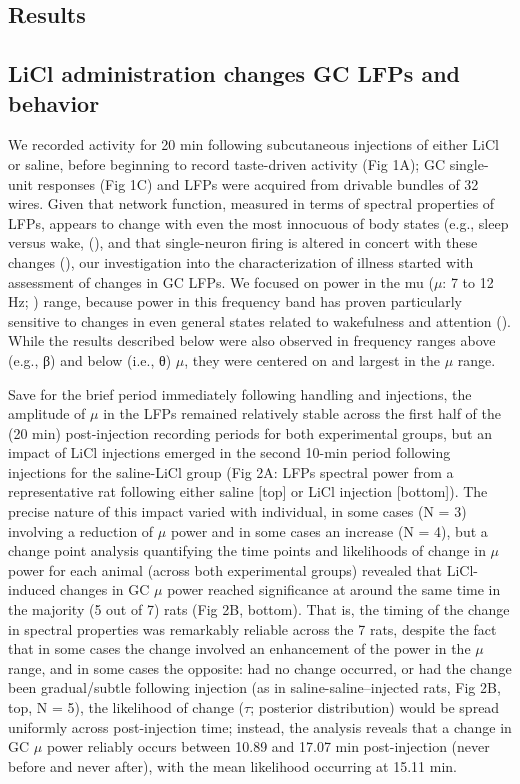\begin{refsection}
{\section{Results}
\subsection{LiCl administration changes GC LFPs and behavior}
We recorded activity for 20 min following subcutaneous injections of either LiCl or saline, before beginning to record taste-driven activity (Fig 1A); GC single-unit responses (Fig 1C) and LFPs were acquired from drivable bundles of 32 wires. Given that network function, measured in terms of spectral properties of LFPs, appears to change with even the most innocuous of body states (e.g., sleep versus wake, (\cite{mukamel2014a,ab2015a}), and that single-neuron firing is altered in concert with these changes (\cite{manning2009a,fontanini2008a}), our investigation into the characterization of illness started with assessment of changes in GC LFPs. We focused on power in the mu (\(\mu\): 7 to 12 Hz; \cite{fontanini2005a}) range, because power in this frequency band has proven particularly sensitive to changes in even general states related to wakefulness and attention (\cite{ching2014a,fontanini2005a,fontanini2006a,tort2010a,vijayan2013a}). While the results described below were also observed in frequency ranges above (e.g., β) and below (i.e., θ) \(\mu\), they were centered on and largest in the \(\mu\) range.

Save for the brief period immediately following handling and injections, the amplitude of \(\mu\) in the LFPs remained relatively stable across the first half of the (20 min) post-injection recording periods for both experimental groups, but an impact of LiCl injections emerged in the second 10-min period following injections for the saline-LiCl group (Fig 2A: LFPs spectral power from a representative rat following either saline [top] or LiCl injection [bottom]). The precise nature of this impact varied with individual, in some cases (N = 3) involving a reduction of \(\mu\) power and in some cases an increase (N = 4), but a change point analysis quantifying the time points and likelihoods of change in \(\mu\) power for each animal (across both experimental groups) revealed that LiCl-induced changes in GC \(\mu\) power reached significance at around the same time in the majority (5 out of 7) rats (Fig 2B, bottom). That is, the timing of the change in spectral properties was remarkably reliable across the 7 rats, despite the fact that in some cases the change involved an enhancement of the power in the \(\mu\) range, and in some cases the opposite: had no change occurred, or had the change been gradual/subtle following injection (as in saline-saline–injected rats, Fig 2B, top, N = 5), the likelihood of change (\(\tau\); posterior distribution) would be spread uniformly across post-injection time; instead, the analysis reveals that a change in GC \(\mu\) power reliably occurs between 10.89 and 17.07 min post-injection (never before and never after), with the mean likelihood occurring at 15.11 min.

}
\end{refsection}
